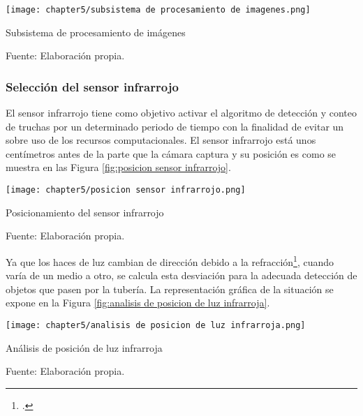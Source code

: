 \begin{myfigure}[H]
	\footnotesize\centering
	\texttt{[image: chapter5/subsistema de procesamiento de imagenes.png]}
	\caption{Subsistema de procesamiento de imágenes}
	\begin{myflushcenter}
		Fuente: Elaboración propia.
	\end{myflushcenter}
	\label{fig:subsistema de procesamiento de imagenes}
\end{myfigure}
 
\subsubsection{Selección del sensor infrarrojo}

El sensor infrarrojo tiene como objetivo activar el algoritmo de detección y conteo de truchas por un determinado periodo de tiempo con la finalidad de evitar un sobre uso de los recursos computacionales. El sensor infrarrojo está unos centímetros antes de la parte que la cámara captura y su posición es como se muestra en las Figura \ref{fig:posicion sensor infrarrojo}.

\begin{myfigure}[H]
	\footnotesize\centering
	\texttt{[image: chapter5/posicion sensor infrarrojo.png]}
	\caption{Posicionamiento del sensor infrarrojo}
	\begin{myflushcenter}
		Fuente: Elaboración propia.
	\end{myflushcenter}
	\label{fig:posicion sensor infrarrojo}
\end{myfigure}

Ya que los haces de luz cambian de dirección debido a la refracción\footnote{\cite{Hecht2017}.}, cuando varía de un medio a otro, se calcula esta desviación para la adecuada detección de objetos que pasen por la tubería. La representación gráfica de la situación se expone en la Figura \ref{fig:analisis de posicion de luz infrarroja}.

\begin{myfigure}[H]
	\footnotesize\centering
	\texttt{[image: chapter5/analisis de posicion de luz infrarroja.png]}
	\caption{Análisis de posición de luz infrarroja}
	\begin{myflushcenter}
		Fuente: Elaboración propia.
	\end{myflushcenter}
	\label{fig:analisis de posicion de luz infrarroja}
\end{myfigure}

